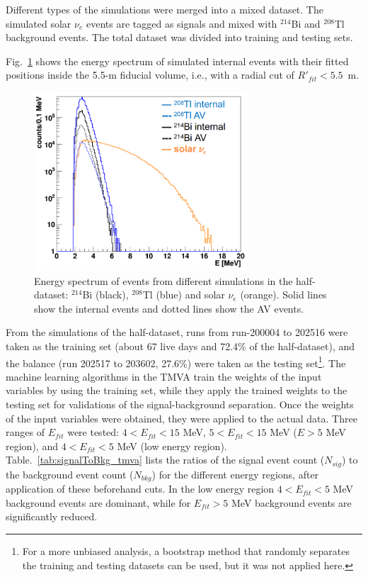 Different types of the simulations were merged into a mixed dataset. The simulated solar $\nu_e$ events are tagged as signals and mixed with $^{214}$Bi and $^{208}$Tl background events. The total dataset was divided into training and testing sets. 

Fig.~\ref{TMVA_bkgs_1} shows the energy spectrum of simulated internal events with their fitted positions inside the 5.5-m fiducial volume, i.e., with a radial cut of $R'_{fit}<5.5$~m.

\begin{figure}[!htb]
	\centering
	\includegraphics[width=8cm]{TMVA_bkgs_1.png}
	\caption[Energy spectrum of events from different simulations.]{Energy spectrum of events from different simulations in the half-dataset: $^{214}$Bi (black), $^{208}$Tl (blue) and solar $\nu_e$ (orange). Solid lines show the internal events and dotted lines show the AV events.}
	\label{TMVA_bkgs_1}
\end{figure}

From the simulations of the half-dataset, runs from run-200004 to 202516 were taken as the training set (about 67 live days and 72.4\% of the half-dataset), and the balance (run 202517 to 203602, 27.6\%) were taken as the testing set\footnote{For a more unbiased analysis, a bootstrap method \cite{murphy2012machine} that randomly separates the training and testing datasets can be used, but it was not applied here.}. The machine learning algorithms in the TMVA train the weights of the input variables by using the training set, while they apply the trained weights to the testing set for validations of the signal-background separation. Once the weights of the input variables were obtained, they were applied to the actual data. Three ranges of $E_{fit}$ were tested: $4<E_{fit}<15$ MeV, $5<E_{fit}<15$ MeV ($E>5$ MeV region), and $4<E_{fit}<5$ MeV (low energy region). Table.~\ref{tab:signalToBkg_tmva} lists the ratios of the signal event count ($N_{sig}$) to the background event count ($N_{bkg}$) for the different energy regions, after application of these beforehand cuts. In the low energy region $4<E_{fit}<5$ MeV background events are dominant, while for  $E_{fit}>5$ MeV background events are significantly reduced.

